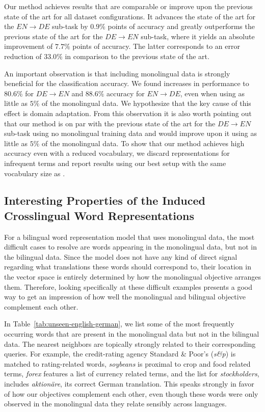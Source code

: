 \documentclass{article} \usepackage{iclr2015,times}
\begin{document}
Our method achieves results that are comparable or improve upon
the previous state of the art for all dataset configurations.
It advances the state of the art for the $EN\rightarrow DE$ 
sub-task by $0.9\%$ points of accuracy and greatly outperforms the 
previous state of the art for the $DE \rightarrow EN$ sub-task,
where it yields an absolute improvement of $7.7\%$ 
points of accuracy.
The latter corresponds to an error reduction of $33.0\%$ in comparison 
to the previous state of the art.

An important observation is that including monolingual data is strongly
beneficial for the classification accuracy.
We found increases in performance to $80.6\%$ for $DE\rightarrow EN$ and
$88.6\%$ accuracy for $EN\rightarrow DE$, even when using as little
as $5\%$ of the monolingual data.
We hypothesize that the key cause of this effect is domain adaptation.
From this observation it is also worth pointing out that our method is on par
with the previous state of the art for the $DE\rightarrow EN$ sub-task 
using no monolingual training data and would improve upon it
using as little as $5\%$ of the monolingual data.
To show that our method achieves high accuracy even with a reduced vocabulary,
we discard representations for infrequent terms and report results using our
best setup with the same vocabulary size as \citet{klementiev2012inducing}.

\subsection{Interesting Properties of the Induced Crosslingual Word Representations}

For a bilingual word representation model that uses monolingual data,
the most difficult cases to resolve are words appearing in
the monolingual data, but not in the bilingual data.
Since the model does not have any kind of direct signal
regarding what translations these words should correspond to,
their location in the vector space is entirely determined
by how the monolingual objective arranges them.
Therefore, looking specifically at these difficult examples presents a
good way to get an impression of how well the monolingual and
bilingual objective complement each other.

In Table~\ref{tab:unseen-english-german},
we list some of the most frequently occurring words that are present
in the monolingual data but not in the bilingual data.
The nearest neighbors are topically strongly related to their corresponding
queries.
For example, the credit-rating agency Standard \& Poor's
(\emph{s\&p}) is matched to rating-related words, \emph{soybeans} is proximal
to crop and food related terms, \emph{forex} features a list of currency
related terms, and the list for \emph{stockholders},
includes \emph{aktion\"are}, its correct German translation.
This speaks strongly in favor of how our objectives complement each other,
even though these words were only observed in the monolingual
data they relate sensibly across languages.
\end{document}
